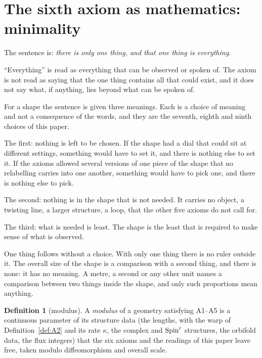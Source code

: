 \documentclass[11pt,a4paper]{article}
\theoremstyle{plain}
\theoremstyle{definition}
\newtheorem{definition}[theorem]{Definition}
\theoremstyle{remark}
\begin{document}
\section{The sixth axiom as mathematics: minimality}\label{sec:minimal}

The sentence is: \emph{there is only one thing, and that one thing is everything}.

``Everything'' is read as everything that can be observed or spoken of. The axiom is not read as saying that the one thing contains all that could exist, and it does not say what, if anything, lies beyond what can be spoken of.

For a shape the sentence is given three meanings. Each is a choice of meaning and not a consequence of the words, and they are the seventh, eighth and ninth choices of this paper.

The first: nothing is left to be chosen. If the shape had a dial that could sit at different settings, something would have to set it, and there is nothing else to set it. If the axioms allowed several versions of one piece of the shape that no relabelling carries into one another, something would have to pick one, and there is nothing else to pick.

The second: nothing is in the shape that is not needed. It carries no object, a twisting line, a larger structure, a loop, that the other five axioms do not call for.

The third: what is needed is least. The shape is the least that is required to make sense of what is observed.

One thing follows without a choice. With only one thing there is no ruler outside it. The overall size of the shape is a comparison with a second thing, and there is none: it has no meaning. A metre, a second or any other unit names a comparison between two things inside the shape, and only such proportions mean anything.

\begin{definition}[modulus]\label{def:modulus}
A \emph{modulus} of a geometry satisfying A1--A5 is a continuous parameter of its structure data (the lengths, with the warp of Definition~\ref{def:A2} and its rate $\kappa$, the complex and $\text{Spin}^c$ structures, the orbifold data, the flux integers) that the six axioms and the readings of this paper leave free, taken modulo diffeomorphism and overall scale.
\end{definition}
\end{document}
